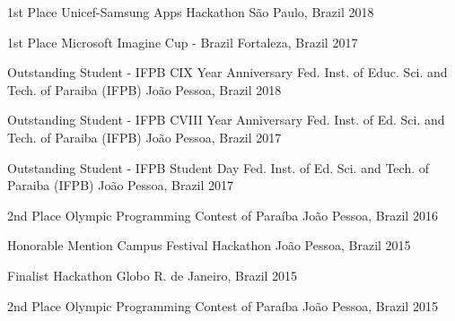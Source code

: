 \begin{cvhonors}

  \cvhonor
    {1st Place} %
    {Unicef-Samsung Apps Hackathon} %
    {São Paulo, Brazil} %
    {2018} %
    
  \cvhonor
    {1st Place} %
    {Microsoft Imagine Cup - Brazil} %
    {Fortaleza, Brazil} %
    {2017} %

  \cvhonor
    {Outstanding Student - IFPB CIX Year Anniversary} %
    {Fed. Inst. of Educ. Sci. and Tech. of Paraiba (IFPB)} %
    {João Pessoa, Brazil} %
    {2018} %
    
  \cvhonor
    {Outstanding Student - IFPB CVIII Year Anniversary} %
    {Fed. Inst. of Ed. Sci. and Tech. of Paraiba (IFPB)} %
    {João Pessoa, Brazil} %
    {2017} %
        
  \cvhonor
    {Outstanding Student - IFPB Student Day} %
    {Fed. Inst. of Ed. Sci. and Tech. of Paraiba (IFPB)} %
    {João Pessoa, Brazil} %
    {2017} %
    
  \cvhonor
    {2nd Place} %
    {Olympic Programming Contest of Paraíba} %
    {João Pessoa, Brazil} %
    {2016} %

  \cvhonor
    {Honorable Mention} %
    {Campus Festival Hackathon} %
    {João Pessoa, Brazil} %
    {2015} %
    
  \cvhonor
    {Finalist} %
    {Hackathon Globo} %
    {R. de Janeiro, Brazil} %
    {2015} %

  \cvhonor
    {2nd Place} %
    {Olympic Programming Contest of Paraíba} %
    {João Pessoa, Brazil} %
    {2015} %

\end{cvhonors}
